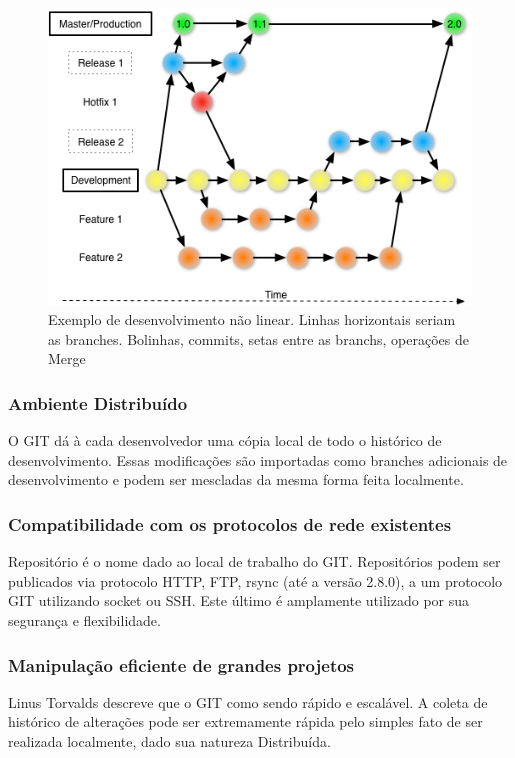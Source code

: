 \documentclass[
	article,			%
	12pt,				%
	oneside,			%
	a4paper,			%
	english,			
	brazil,
	sumario=tradicional
	]{abntex2}
\begin{document}
\begin{figure}[!h]
\centering
\includegraphics[scale=0.5]{images/git_workflow.png}
\caption{Exemplo de desenvolvimento não linear. Linhas horizontais seriam as branches. Bolinhas, commits, setas entre as branchs, operações de Merge}
\label{img_git_workflow}
\end{figure}

\subsubsection{Ambiente Distribuído}

O GIT dá à cada desenvolvedor uma cópia local de todo o histórico de desenvolvimento. Essas modificações são importadas como branches adicionais de desenvolvimento e podem ser mescladas da mesma forma feita localmente.

\subsubsection{Compatibilidade com os protocolos de rede existentes}
Repositório é o nome dado ao local de trabalho do GIT. Repositórios podem ser publicados via protocolo HTTP, FTP, rsync (até a versão 2.8.0), a um protocolo GIT utilizando socket ou SSH. Este último é amplamente utilizado por sua segurança e flexibilidade.

\subsubsection{Manipulação eficiente de grandes projetos}
Linus Torvalds descreve que o GIT como sendo rápido e escalável. A coleta de histórico de alterações pode ser extremamente rápida pelo simples fato de ser realizada localmente, dado sua natureza Distribuída.
\end{document}
